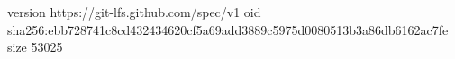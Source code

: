 version https://git-lfs.github.com/spec/v1
oid sha256:ebb728741c8cd432434620cf5a69add3889c5975d0080513b3a86db6162ac7fe
size 53025
